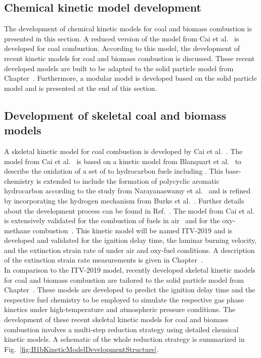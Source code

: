 \begin{refsection}
\newpage
\section{Chemical kinetic model development}
The development of chemical kinetic models for coal and biomass combustion is presented in this section. A reduced version of the model from Cai et al.~\cite{Cai2020} is developed for coal combustion. According to this model, the development of recent kinetic models for coal and biomass combustion is discussed. These recent developed models are built to be adapted to the solid particle model from Chapter~. Furthermore, a modular  model is developed based on the solid particle model and is presented at the end of this section.


\subsection{Development of skeletal coal and biomass models}
A skeletal kinetic model for coal combustion is developed by Cai et al.~\cite{Cai2019}. The model from Cai et al.~\cite{Cai2019} is based on a kinetic model from Blanquart et al.~\cite{Blanquart2009} to describe the oxidation of a set of  to  hydrocarbon fuels including . This base-chemistry is extended to include the formation of polycyclic aromatic hydrocarbon according to the study from Narayanaswamy et al.~\cite{Narayanaswamy2010} and is refined by incorporating the hydrogen mechanism from Burke et al.~\cite{Burke2012}. Further details about the development process can be found in Ref.~\cite{Cai2019,Cai2020}. The model from Cai et al.~\cite{Cai2020} is extensively validated for the combustion of fuels in air~\cite{Cai2019} and for the oxy-methane combustion~\cite{Cai2020}. This kinetic model will be named ITV-2019 and is developed and validated for the ignition delay time, the laminar burning velocity, and the extinction strain rate of  under air and oxy-fuel conditions. A description of the extinction strain rate measurements is given in Chapter~.
\\
In comparison to the ITV-2019 model, recently developed skeletal kinetic models for coal and biomass combustion are tailored to the solid particle model from Chapter~. These models are developed to predict the ignition delay time and the respective fuel chemistry to be employed to simulate the respective gas phase kinetics under high-temperature and atmospheric pressure conditions. The development of these recent skeletal kinetic models for coal and biomass combustion involves a multi-step reduction strategy using detailed chemical kinetic models. A schematic of the whole reduction strategy is summarized in Fig.~\ref{fig:B1bKineticModelDevelopmentStructure}.

\end{refsection}
